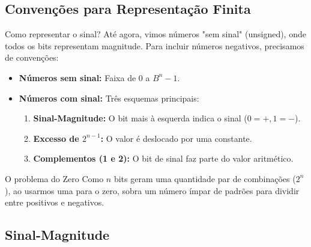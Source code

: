 \subsection{Convenções para Representação Finita}

\begin{frame}{Como representar o sinal?}
    Até agora, vimos números "sem sinal" (unsigned), onde todos os bits representam magnitude. Para incluir números negativos, precisamos de convenções:

    \begin{itemize}
        \item \textbf{Números sem sinal:} Faixa de $0$ a $B^n - 1$.
        \item \textbf{Números com sinal:} Três esquemas principais:
              \begin{enumerate}
                  \item \textbf{Sinal-Magnitude:} O bit mais à esquerda indica o sinal ($0 = +, 1 = -$).
                  \item \textbf{Excesso de $2^{n-1}$:} O valor é deslocado por uma constante.
                  \item \textbf{Complementos (1 e 2):} O bit de sinal faz parte do valor aritmético.
              \end{enumerate}
    \end{itemize}

    \begin{block}{O problema do Zero}
        Como $n$ bits geram uma quantidade par de combinações ($2^n$), ao usarmos uma para o zero, sobra um número ímpar de padrões para dividir entre positivos e negativos.
    \end{block}
\end{frame}

\subsection{Sinal-Magnitude}

